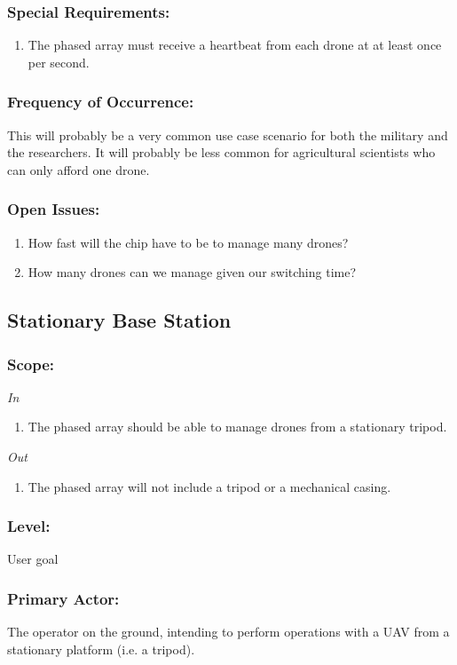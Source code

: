 \documentclass[ProductRequirements.tex]{subfiles}
\begin{document}
	\subsubsection*{Special Requirements:}
	\begin{enumerate}\itemsep1pt
		\item The phased array must receive a heartbeat from each drone at at least once per second.
	\end{enumerate}
	\subsubsection*{Frequency of Occurrence:}
	This will probably be a very common use case scenario for both the military and the researchers. It will probably be less common for agricultural scientists who can only afford one drone.
	\subsubsection*{Open Issues:}
	\begin{enumerate}
		\item How fast will the chip have to be to manage many drones?
		\item How many drones can we manage given our switching time?
	\end{enumerate}
	
	\subsection{Stationary Base Station}
	\subsubsection*{Scope:}
	\textit{In}
	\begin{enumerate}
		\item The phased array should be able to manage drones from a stationary tripod.
	\end{enumerate}
	\textit{Out}
	\begin{enumerate}
		\item The phased array will not include a tripod or a mechanical casing.
	\end{enumerate}
	\subsubsection*{Level:}
	User goal
	\subsubsection*{Primary Actor:}
	The operator on the ground, intending to perform operations with a UAV from a stationary platform (i.e. a tripod).
\end{document}
